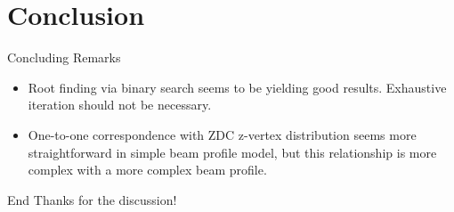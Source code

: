 \section{Conclusion}
\label{ch:Conclusion}

\begin{frame}{Concluding Remarks}
\begin{itemize}
\item Root finding via binary search seems to be yielding good results.
	Exhaustive iteration should not be necessary.
\item One-to-one correspondence with ZDC z-vertex distribution seems more
	straightforward in simple beam profile model, but this relationship is more
	complex with a more complex beam profile.
\end{itemize}
\end{frame}

\begin{frame}{End}
Thanks for the discussion!
\end{frame}
